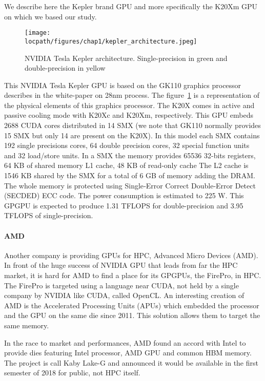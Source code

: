 We describe here the Kepler brand GPU and more specifically the K20Xm GPU on which we based our study. 
\begin{figure}
\centering
\texttt{[image: \\locpath/figures/chap1/kepler\_architecture.jpeg]}
\caption{NVIDIA Tesla Kepler architecture. Single-precision in green and double-precision in yellow}
\label{fig:2_HARD:kepler_arch}
\end{figure}
This NVIDIA Tesla Kepler GPU is based on the GK110 graphics processor describes in the white-paper\cite{nvidia2012nvidias} on 28nm process.
The figure~\ref{fig:2_HARD:kepler_arch} is a representation of the physical elements of this graphics processor. 
The K20X comes in active and passive cooling mode with K20Xc and K20Xm, respectively.
This GPU embeds 2688 CUDA cores distributed in 14 SMX (we note that GK110 normally provides 15 SMX but only 14 are present on the K20X).
In this model each SMX contains 192 single precisions cores, 64 double precision cores, 32 special function units and 32 load/store units.
In a SMX the memory provides 65536 32-bits registers, 64 KB of shared memory L1 cache, 48 KB of read-only cache
The L2 cache is 1546 KB shared by the SMX for a total of 6 GB of memory adding the DRAM.
The whole memory is protected using Single‐Error Correct Double‐Error Detect (SECDED) ECC code.
The power consumption is estimated to 225 W.
This GPGPU is expected to produce 1.31 TFLOPS for double-precision and 3.95 TFLOPS of single-precision.

\paragraph{AMD}
Another company is providing GPUs for HPC, Advanced Micro Devices (AMD). 
In front of the huge success of NVIDIA GPU that leads from far the HPC market, it is hard for AMD to find a place for its GPGPUs, the FirePro, in HPC. 
The FirePro is targeted using a language near CUDA, not held by a single company by NVIDIA like CUDA, called OpenCL. 
An interesting creation of AMD is the Accelerated Processing Units (APUs) which embedded the processor and the GPU on the same die since 2011. 
This solution allows them to target the same memory. 

In the race to market and performances, AMD found an accord with Intel to provide dies featuring Intel processor, AMD GPU and common HBM memory. 
The project is call Kaby Lake-G and announced it would be available in the first semester of 2018 for public, not HPC itself. 

